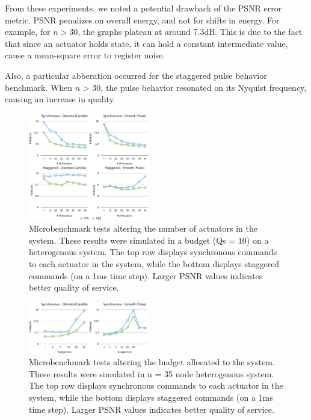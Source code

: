 \documentclass{sigchi}
\begin{document}
  From these experiments, we noted a potential drawback of the PSNR error metric. PSNR penalizes on overall energy, and not for shifts in energy. For example, for $n > 30$, the graphs plateau at around 7.3dB. This is due to the fact that since an actuator holds state, it can hold a constant intermediate value, cause a mean-square error to register noise.

  Also, a particular abberation occurred for the staggered pulse behavior benchmark. When $n$ > 30, the pulse behavior resonated on its Nyquist frequency, causing an increase in quality.




  \begin{figure}[t]
      \centering
      \includegraphics[keepaspectratio, width=0.47\textwidth]{figures/pulse_actuators.pdf}
      \caption{ Microbenchmark tests altering the number of actuators in the system. These results were simulated in a budget (Qs = 10) on a heterogenous system. The top row displays synchronous commands to each actuator in the system, while the bottom displays staggered commands (on a 1ms time step). Larger PSNR values indicates better quality of service.  }
        \label{fig:pulse_actuators} 
    \end{figure}

     \begin{figure}[t]
      \centering
      \includegraphics[keepaspectratio, width=0.47\textwidth]{figures/micro_system.pdf}
      \caption{ Microbenchmark tests altering the budget allocated to the system.  These results were simulated in n = 35 node heterogenous system. The top row displays synchronous commands to each actuator in the system, while the bottom displays staggered commands (on a 1ms time step). Larger PSNR values indicates better quality of service.  }
        \label{fig:micro_system} 
    \end{figure}
\end{document}
